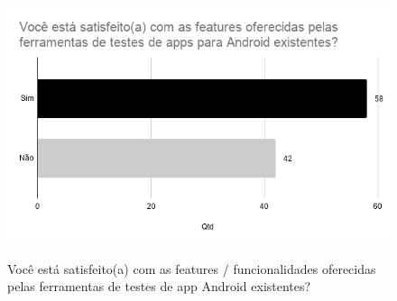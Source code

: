     
    
        \begin{figure}[!htb]
        \centering
        \includegraphics[width=.80\textwidth]{images/s_featuresexistentes.png}
        \label{figure:s_featuresexistentes}
        \caption{Você está satisfeito(a) com as features  / funcionalidades oferecidas pelas ferramentas de testes de app Android existentes?}
        \end{figure}


    
    
















